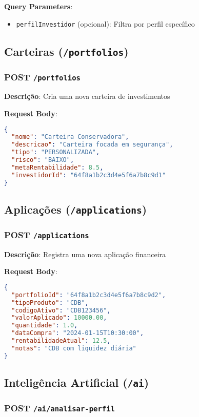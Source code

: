 \documentclass[12pt,a4paper]{article}
\begin{document}
\textbf{Query Parameters}:
\begin{itemize}
    \item \texttt{perfilInvestidor} (opcional): Filtra por perfil específico
\end{itemize}

\subsection{Carteiras (\texttt{/portfolios})}

\subsubsection{POST \texttt{/portfolios}}

\textbf{Descrição}: Cria uma nova carteira de investimentos

\textbf{Request Body}:
\begin{lstlisting}[language=json]
{
  "nome": "Carteira Conservadora",
  "descricao": "Carteira focada em segurança",
  "tipo": "PERSONALIZADA",
  "risco": "BAIXO",
  "metaRentabilidade": 8.5,
  "investidorId": "64f8a1b2c3d4e5f6a7b8c9d1"
}
\end{lstlisting}

\subsection{Aplicações (\texttt{/applications})}

\subsubsection{POST \texttt{/applications}}

\textbf{Descrição}: Registra uma nova aplicação financeira

\textbf{Request Body}:
\begin{lstlisting}[language=json]
{
  "portfolioId": "64f8a1b2c3d4e5f6a7b8c9d2",
  "tipoProduto": "CDB",
  "codigoAtivo": "CDB123456",
  "valorAplicado": 10000.00,
  "quantidade": 1.0,
  "dataCompra": "2024-01-15T10:30:00",
  "rentabilidadeAtual": 12.5,
  "notas": "CDB com liquidez diária"
}
\end{lstlisting}

\subsection{Inteligência Artificial (\texttt{/ai})}

\subsubsection{POST \texttt{/ai/analisar-perfil}}
\end{document}

